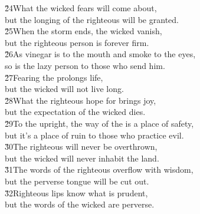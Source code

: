\begin{poetry}
\poeml \v{24}What the wicked fears will come about, \\
\poemll    but the longing of the righteous will be granted. \\
\poeml \v{25}When the storm ends, the wicked vanish, \\
\poemll    but the righteous person is forever firm. \\
\poeml \v{26}As vinegar is to the mouth and smoke to the eyes, \\
\poemll    so is the lazy person to those who send him. \\
\poeml \v{27}Fearing the  prolongs life, \\
\poemll    but the wicked will not live long. \\
\poeml \v{28}What the righteous hope for brings joy, \\
\poemll    but the expectation of the wicked dies. \\
\poeml \v{29}To the upright, the way of the  is a place of safety, \\
\poemll    but it's a place of ruin to those who practice evil. \\
\poeml \v{30}The righteous will never be overthrown, \\
\poemll    but the wicked will never inhabit the land. \\
\poeml \v{31}The words of the righteous overflow with wisdom, \\
\poemll    but the perverse tongue will be cut out. \\
\poeml \v{32}Righteous lips know what is prudent, \\
\poemll    but the words of the wicked are perverse.
\end{poetry}

